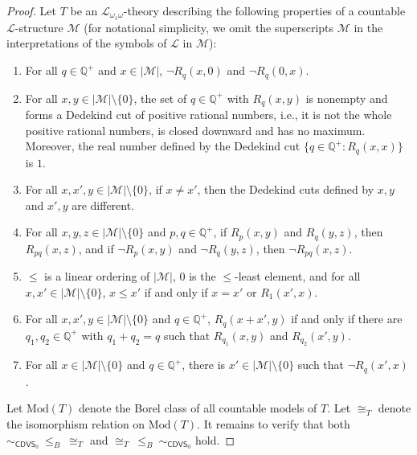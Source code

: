 \documentclass{amsart}
\theoremstyle{definition}
\theoremstyle{remark}
\begin{document}
\begin{proof}
 Let $T$ be an $\mathcal{L}_{\omega_1\omega}$-theory describing the following properties of a countable $\mathcal{L}$-structure $\mathcal{M}$ (for notational simplicity, we omit the superscripts $\mathcal{M}$ in the interpretations of the symbols of $\mathcal{L}$ in $\mathcal{M}$):
    \begin{enumerate}
        \item For all $q \in \mathbb{Q}^+$ and $x \in |\mathcal{M}|$, $\lnot R_q(x,0)$ and $\lnot R_q(0,x)$. 
        \item For all $x,y\in |\mathcal{M}|\setminus\{0\}$, the set of $q\in \mathbb{Q}^+$ with $R_q(x,y)$ is nonempty and forms a Dedekind cut of positive rational numbers, i.e., it is not the whole positive rational numbers, is closed downward and has no maximum. Moreover, the real number defined by the Dedekind cut $\{q \in \mathbb{Q}^+\colon R_q(x,x)\}$ is $1$. 
        \item For all $x,x',y \in |\mathcal{M}|\setminus\{0\}$, if $x\neq x'$, then the Dedekind cuts defined by $x,y$ and $x',y$ are different. 
        \item For all $x,y,z \in |\mathcal{M}|\setminus\{0\}$ and $p,q \in \mathbb{Q}^+$, if $R_p(x,y)$ and $R_q(y,z)$, then $R_{pq}(x,z)$, and if $\lnot R_p(x,y)$ and $\lnot R_q(y,z)$, then $\lnot R_{pq}(x,z)$. 
        \item $\leq$ is a linear ordering of $|\mathcal{M}|$,  $0$ is the $\leq$-least element, and for all $x,x'\in |\mathcal{M}|\setminus\{0\}$, $x \leq x'$ if and only if $x = x'$ or $R_1(x',x)$. 
        \item For all $x,x',y \in |\mathcal{M}|\setminus\{0\}$ and $q \in \mathbb{Q}^+$, $R_q(x+x',y)$ if and only if there are $q_1,q_2\in\mathbb{Q}^+$ with $q_1+q_2=q$ such that $R_{q_1}(x,y)$ and $R_{q_2}(x',y)$. 
        \item For all $x \in |\mathcal{M}|\setminus\{0\}$ and $q \in \mathbb{Q}^+$, there is $x' \in |\mathcal{M}|\setminus\{0\}$ such that $\lnot R_q(x',x)$. 
    \end{enumerate}
Let $\mbox{Mod}(T)$ denote the Borel class of all countable models of $T$. Let $\cong_T$ denote the isomorphism relation on $\mbox{Mod}(T)$. It remains to verify that both $\sim_{\mathsf{CDVS}_0}\ \leq_B\ \cong_T$ and $\cong_T\ \leq_B\  \sim_{\mathsf{CDVS}_0}$ hold. 


\end{proof}
\end{document}
